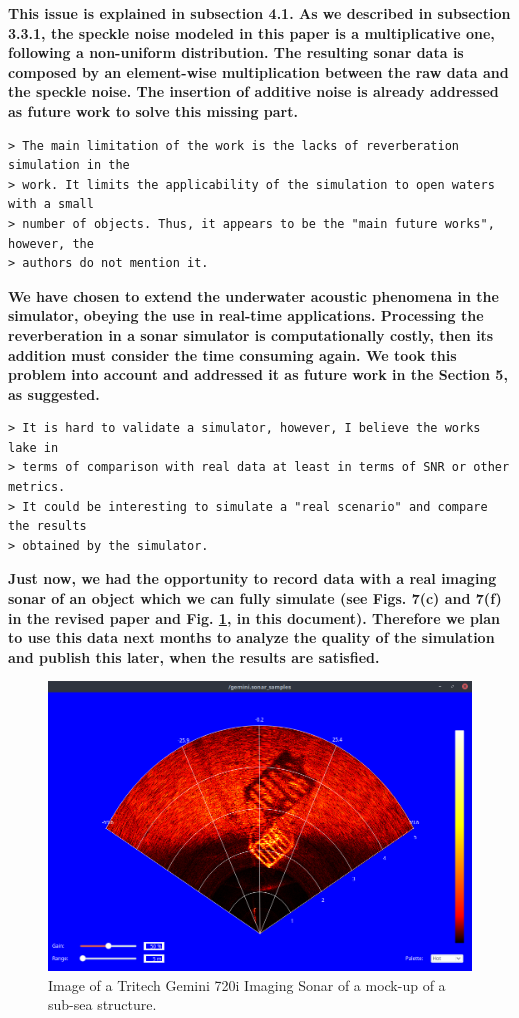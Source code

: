 \documentclass{article}
\begin{document}
\textbf{This issue is explained in subsection 4.1. As we described in
subsection 3.3.1, the speckle noise modeled in this paper is a multiplicative one,
following a non-uniform distribution. The resulting sonar data is composed by
an element-wise multiplication between the raw data and the speckle noise. The
insertion of additive noise is already addressed as future work to solve this
missing part.}

\begin{verbatim}
> The main limitation of the work is the lacks of reverberation simulation in the
> work. It limits the applicability of the simulation to open waters with a small
> number of objects. Thus, it appears to be the "main future works", however, the
> authors do not mention it.
\end{verbatim}

\textbf{We have chosen to extend the underwater acoustic phenomena in the
simulator, obeying the use in real-time applications. Processing the
reverberation in a sonar simulator is computationally costly, then its
addition must consider the time consuming again. We took this problem
into account and addressed it as future work in the Section 5, as suggested.}

\begin{verbatim}
> It is hard to validate a simulator, however, I believe the works lake in
> terms of comparison with real data at least in terms of SNR or other metrics.
> It could be interesting to simulate a "real scenario" and compare the results
> obtained by the simulator.
\end{verbatim}

\textbf{Just now, we had the opportunity to record data with a real imaging sonar of an object which we can fully simulate (see Figs. 7(c) and 7(f) in the revised paper and Fig. \ref{fig:real_sonar}, in this document). Therefore we plan to use this data next months to analyze the quality of the simulation and publish this later, when the results are satisfied.}
\newpage

\begin{figure}[tb]
    \includegraphics[width=0.7\columnwidth]{figs/real_ssiv}
    \centering
    \caption{Image of a Tritech Gemini 720i Imaging Sonar of a mock-up of a sub-sea structure.}
    \label{fig:real_sonar}
\end{figure}
\end{document}
